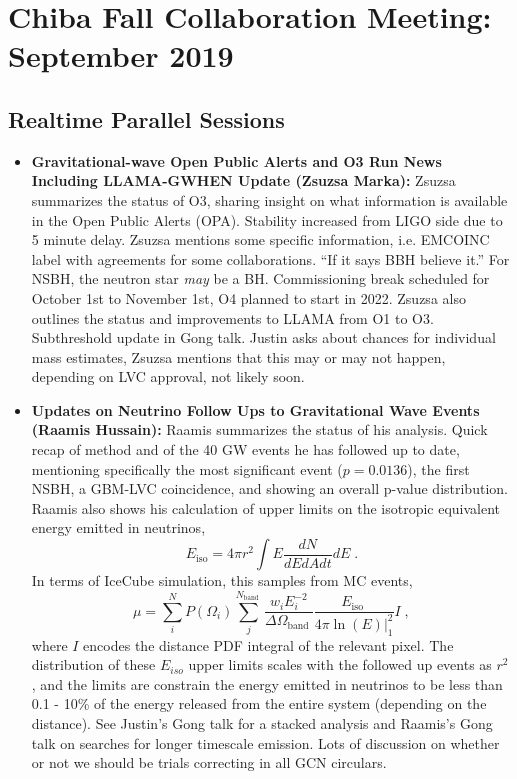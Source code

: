 \chapter*{Chiba Fall Collaboration Meeting: September 2019}

\section*{Realtime Parallel Sessions}
\begin{itemize}
    \item \textbf{Gravitational-wave Open Public Alerts and O3 Run News Including LLAMA-GWHEN Update (Zsuzsa Marka):} Zsuzsa summarizes the status of O3, sharing insight on what information is available in the Open Public Alerts (OPA). Stability increased from LIGO side due to 5 minute delay. Zsuzsa mentions some specific information, i.e. EMCOINC label with agreements for some collaborations. ``If it says BBH believe it.'' For NSBH, the neutron star \textit{may} be a BH. Commissioning break scheduled for October 1st to November 1st, O4 planned to start in 2022. Zsuzsa also outlines the status and improvements to LLAMA from O1 to O3. Subthreshold update in Gong talk. Justin asks about chances for individual mass estimates, Zsuzsa mentions that this may or may not happen, depending on LVC approval, not likely soon. 
    \item \textbf{Updates on Neutrino Follow Ups to Gravitational Wave Events (Raamis Hussain):} Raamis summarizes the status of his analysis. Quick recap of method and of the 40 GW events he has followed up to date, mentioning specifically the most significant event ($p= 0.0136$), the first NSBH, a GBM-LVC coincidence, and showing an overall p-value distribution. Raamis also shows his calculation of upper limits on the isotropic equivalent energy emitted in neutrinos, 
    $$ E_{\mathrm{iso}}=4 \pi r^{2} \int E \frac{d N}{d E d A d t} d E\;.$$ In terms of IceCube simulation, this samples from MC events, $$ \mu=\sum_{i}^{N} P\left(\Omega_{i}\right) \sum_{j}^{N_{\text {band }}} \frac{w_{i} E_{i}^{-2}}{\Delta \Omega_{\text {band }}} \frac{E_{\text {iso }}}{ 4 \pi \ln (E) |_{1}^2} I\;,$$ where $I$ encodes the distance PDF integral of the relevant pixel. The distribution of these $E_{iso}$ upper limits scales with the followed up events as $r^2$, and the limits are constrain the energy emitted in neutrinos to be less than 0.1 - 10\% of the energy released from the entire system (depending on the distance). See Justin's Gong talk for a stacked analysis and Raamis's Gong talk on searches for longer timescale emission. Lots of discussion on whether or not we should be trials correcting in all GCN circulars. 

\end{itemize}
